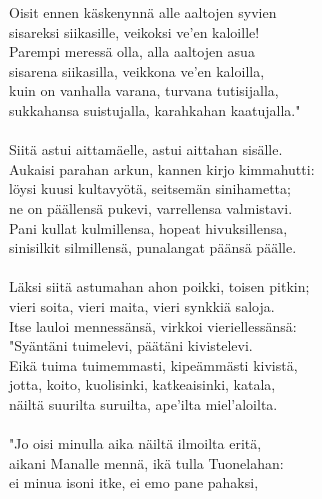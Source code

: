 Oisit ennen käskenynnä alle aaltojen syvien                    \\
sisareksi siikasille, veikoksi ve'en kaloille!                 \\
Parempi meressä olla, alla aaltojen asua                       \\
sisarena siikasilla, veikkona ve'en kaloilla,                  \\
kuin on vanhalla varana, turvana tutisijalla,                  \\
sukkahansa suistujalla, karahkahan kaatujalla."                \\
                                                               \\
Siitä astui aittamäelle, astui aittahan sisälle.               \\
Aukaisi parahan arkun, kannen kirjo kimmahutti:                \\
löysi kuusi kultavyötä, seitsemän sinihametta;                 \\
ne on päällensä pukevi, varrellensa valmistavi.                \\
Pani kullat kulmillensa, hopeat hivuksillensa,                 \\
sinisilkit silmillensä, punalangat päänsä päälle.              \\
                                                               \\
Läksi siitä astumahan ahon poikki, toisen pitkin;              \\
vieri soita, vieri maita, vieri synkkiä saloja.                \\
Itse lauloi mennessänsä, virkkoi vieriellessänsä:              \\
"Syäntäni tuimelevi, päätäni kivistelevi.                      \\
Eikä tuima tuimemmasti, kipeämmästi kivistä,                   \\
jotta, koito, kuolisinki, katkeaisinki, katala,                \\
näiltä suurilta suruilta, ape'ilta miel'aloilta.               \\
                                                               \\
"Jo oisi minulla aika näiltä ilmoilta eritä,                   \\
aikani Manalle mennä, ikä tulla Tuonelahan:                    \\
ei minua isoni itke, ei emo pane pahaksi,                      \\
